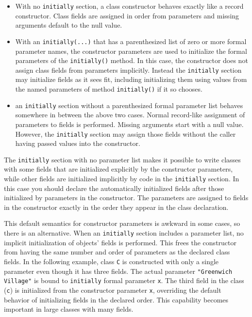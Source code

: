 \begin{itemize}
\item With no \texttt{initially} section, a class constructor behaves
exactly like a record constructor. Class fields are assigned in order
from parameters and missing arguments default to the null value.

\item With an \texttt{initially(...)} that has a parenthesized list of
zero or more formal parameter names, the constructor parameters are used
to initialize the formal parameters of the \texttt{initially()} method.
In this case, the constructor does not assign class fields
from parameters implicitly. Instead the \texttt{initially} section may
initialize fields as it sees fit, including initializing them using
values from the named parameters of method \texttt{initially()}
if it so chooses.

\item an \texttt{initially} section without a parenthesized
formal parameter list behaves somewhere in between the above two
cases.  Normal record-like assignment of parameters to fields is performed.
Missing arguments start with a null value. However,
the \texttt{initially} section may assign those
fields without the caller having passed values into the constructor.
\end{itemize}

The \texttt{initially} section with no parameter list makes it possible to
write classes with some fields that are initialized explicitly by the
constructor parameters, while other fields are initialized implicitly
by code in the \texttt{initially} section. In this case you should
declare the automatically initialized fields after those
initialized by parameters in the constructor.
The parameters are assigned to fields in the constructor
exactly in the order they appear in the class declaration.

This default semantics for constructor parameters is awkward in some
cases, so there is an alternative.
When an \texttt{initially} section includes a
parameter list, no implicit initialization of objects'
fields is performed. This frees the constructor from having the same
number and order of parameters as the declared class fields. In the
following example, class \texttt{C} is constructed with only a single
parameter even though it has three fields. The actual parameter
\texttt{"Greenwich Village"} is bound to \texttt{initially}
formal parameter \texttt{x}.  The third field in the class (\texttt{c}) is
initialized from the constructor parameter \texttt{x}, overriding
the default behavior of initializing
fields in the declared order. This capability becomes important in
large classes with many fields.

